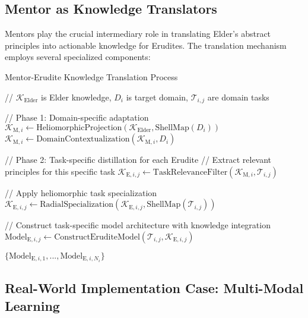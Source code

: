 \subsection{Mentor as Knowledge Translators}

Mentors play the crucial intermediary role in translating Elder's abstract principles into actionable knowledge for Erudites. The translation mechanism employs several specialized components:

\begin{algorithm}
\caption{Mentor-Erudite Knowledge Translation Process}
\begin{algorithmic}[1]
    \State // $\mathcal{K}_{\text{Elder}}$ is Elder knowledge, $D_i$ is target domain, $\mathcal{T}_{i,j}$ are domain tasks
    
    \State // Phase 1: Domain-specific adaptation
    \State $\mathcal{K}_{\text{M},i} \gets \text{HeliomorphicProjection}(\mathcal{K}_{\text{Elder}}, \text{ShellMap}(D_i))$
    \State $\mathcal{K}_{\text{M},i} \gets \text{DomainContextualization}(\mathcal{K}_{\text{M},i}, D_i)$
    
    \State // Phase 2: Task-specific distillation for each Erudite
        \State // Extract relevant principles for this specific task
        \State $\mathcal{K}_{\text{E},i,j} \gets \text{TaskRelevanceFilter}(\mathcal{K}_{\text{M},i}, \mathcal{T}_{i,j})$
        
        \State // Apply heliomorphic task specialization
        \State $\mathcal{K}_{\text{E},i,j} \gets \text{RadialSpecialization}(\mathcal{K}_{\text{E},i,j}, \text{ShellMap}(\mathcal{T}_{i,j}))$
        
        \State // Construct task-specific model architecture with knowledge integration
        \State $\text{Model}_{\text{E},i,j} \gets \text{ConstructEruditeModel}(\mathcal{T}_{i,j}, \mathcal{K}_{\text{E},i,j})$
    \EndFor
    
    \State \Return $\{\text{Model}_{\text{E},i,1},...,\text{Model}_{\text{E},i,N_i}\}$
\EndFunction
\end{algorithmic}
\end{algorithm}

\subsection{Real-World Implementation Case: Multi-Modal Learning}

